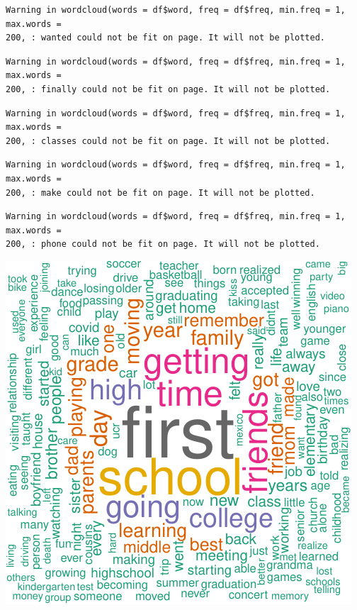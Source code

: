 \documentclass[
  .7em,
  letterpaper,
  DIV=11,
  numbers=noendperiod]{scrartcl}
\begin{document}
\begin{verbatim}
Warning in wordcloud(words = df$word, freq = df$freq, min.freq = 1, max.words =
200, : wanted could not be fit on page. It will not be plotted.
\end{verbatim}

\begin{verbatim}
Warning in wordcloud(words = df$word, freq = df$freq, min.freq = 1, max.words =
200, : finally could not be fit on page. It will not be plotted.
\end{verbatim}

\begin{verbatim}
Warning in wordcloud(words = df$word, freq = df$freq, min.freq = 1, max.words =
200, : classes could not be fit on page. It will not be plotted.
\end{verbatim}

\begin{verbatim}
Warning in wordcloud(words = df$word, freq = df$freq, min.freq = 1, max.words =
200, : make could not be fit on page. It will not be plotted.
\end{verbatim}

\begin{verbatim}
Warning in wordcloud(words = df$word, freq = df$freq, min.freq = 1, max.words =
200, : phone could not be fit on page. It will not be plotted.
\end{verbatim}

\includegraphics{EpMemNet_LabPres_htmldoc_files/figure-pdf/unnamed-chunk-2-1.pdf}
\end{document}
